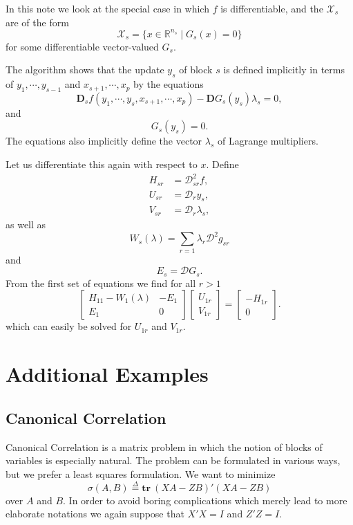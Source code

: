 \documentclass[
  12pt,
]{book}
\begin{document}
In this note we look at the special case in which \(f\) is differentiable, and the \(\mathcal{X}_s\) are of the form
\[
\mathcal{X}_s=\{x\in\mathbb{R}^{n_s}\mid G_s(x)=0\}
\]
for some differentiable vector-valued \(G_s\).

The algorithm shows that the update \(y_s\) of
block \(s\)
is defined implicitly in terms of \(y_1,\cdots,y_{s-1}\) and \(x_{s+1},\cdots,x_p\) by the equations
\[
\mathbf{D}_sf(y_1,\cdots,y_s,x_{s+1},\cdots,x_p)-\mathbf{D}G_s(y_s)\lambda_s=0,
\]
and
\[
G_s(y_s)=0.
\]
The equations also implicitly define the
vector \(\lambda_s\) of Lagrange multipliers.

Let us differentiate this again with respect to \(x\). Define
\begin{align*}
H_{sr}&=\mathcal{D}_{sr}^2f,\\
U_{sr}&=\mathcal{D}_{r}y_s,\\
V_{sr}&=\mathcal{D}_{r}\lambda_s,
\end{align*}
as well as
\[
W_s(\lambda)=\sum_{r=1} \lambda_r\mathcal{D}^2g_{sr}
\]
and
\[
E_s=\mathcal{D}G_s.
\]
From the first set of equations we find for all \(r>1\)
\[
\begin{bmatrix}
H_{11}-W_1(\lambda)& -E_1\\
E_1 &0
\end{bmatrix}
\begin{bmatrix}
U_{1r}\\
V_{1r}
\end{bmatrix}
=
\begin{bmatrix}-H_{1r}\\
0
\end{bmatrix}.
\]
which can easily be solved for \(U_{1r}\) and \(V_{1r}\).

\hypertarget{blockrelaxation:additionalexamples}{%
\section{Additional Examples}\label{blockrelaxation:additionalexamples}}

\hypertarget{blockrelaxation:additionalexamples:canonicalcorrelation}{%
\subsection{Canonical Correlation}\label{blockrelaxation:additionalexamples:canonicalcorrelation}}

Canonical Correlation is a matrix problem in which the notion
of blocks of variables is especially natural. The problem can
be formulated in various ways, but we prefer a least squares
formulation. We want to minimize
\[\sigma(A,B)\mathop{=}\limits^{\Delta}\mathbf{tr }\ (XA-ZB)'(XA-ZB)\]
over \(A\) and \(B.\) In order to avoid boring complications which merely lead to more elaborate notations we again suppose that \(X'X=I\) and \(Z'Z=I\).
\end{document}
